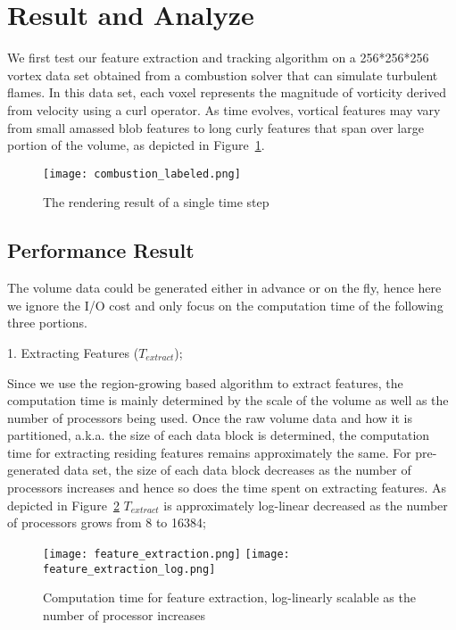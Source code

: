 \section{Result and Analyze}
We first test our feature extraction and tracking algorithm on a 256*256*256 vortex data set obtained from a combustion solver that can simulate turbulent flames. In this data set, each voxel represents the magnitude of vorticity derived from velocity using a curl operator. As time evolves, vortical features may vary from small amassed blob features to long curly features that span over large portion of the volume, as depicted in Figure~\ref{fig:combustion-labeled}.

\begin{figure}[!htp]
\texttt{[image: combustion\_labeled.png]}
\caption{The rendering result of a single time step }
\label{fig:combustion-labeled}
\end{figure}

\subsection{Performance Result}
The volume data could be generated either in advance or on the fly, hence here we ignore the I/O cost and only focus on the computation time of the following three portions.

1. Extracting Features ($T_{extract}$);

Since we use the region-growing based algorithm to extract features, the computation time is mainly determined by the scale of the volume as well as the number of processors being used. Once the raw volume data and how it is partitioned, a.k.a. the size of each data block is determined, the computation time for extracting residing features remains approximately the same. For pre-generated data set, the size of each data block decreases as the number of processors increases and hence so does the time spent on extracting features. As depicted in Figure~\ref{fig:feature-extraction} $T_{extract}$ is approximately log-linear decreased as the number of processors grows from 8 to 16384;

\begin{figure}[ht]
	\centering
	\texttt{[image: feature\_extraction.png]}
	\texttt{[image: feature\_extraction\_log.png]}
	\caption{Computation time for feature extraction, log-linearly scalable as the number of processor increases}
	\label{fig:feature-extraction}
\end{figure}

